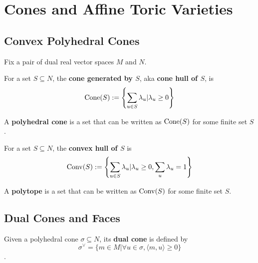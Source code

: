 \section{Cones and Affine Toric Varieties}

\subsection{Convex Polyhedral Cones}

Fix a pair of dual real vector spaces $M$ and $N$.


\begin{definition}
  \label{1-2-1-cone-hull}
  \uses{}
  \leanok

  For a set $S \subseteq N$, the {\bf cone generated by $S$}, aka {\bf cone hull of $S$}, is
  $$\operatorname{Cone}(S) := \left\{\sum_{u \in S} \lambda_u | \lambda_u \ge 0\right\}$$
\end{definition}


\begin{definition}
  \label{1-2-1-polyhedral-cone}

  A {\bf polyhedral cone} is a set that can be written as $\operatorname{Cone}(S)$ for some finite set $S$.
\end{definition}


\begin{definition}
  \label{1-2-2-convex-hull}
  \uses{}
  \leanok

  For a set $S \subseteq N$, the {\bf convex hull of $S$} is
  $$\operatorname{Conv}(S) := \left\{\sum_{u \in S} \lambda_u | \lambda_u \ge 0, \sum_u \lambda_u = 1\right\}$$
\end{definition}


\begin{definition}[Polytope]
  \label{1-2-2-polytope}
  \leanok

  A {\bf polytope} is a set that can be written as $\operatorname{Conv}(S)$ for some finite set $S$.
\end{definition}


\subsection{Dual Cones and Faces}


\begin{definition}
  \label{1-2-3-dual-cone}
  \leanok

  Given a polyhedral cone $\sigma \subseteq N$, its {\bf dual cone} is defined by
  $$\sigma^\vee = \{m \in M | \forall u \in \sigma, \langle m, u\rangle \ge 0\}$$.
\end{definition}



